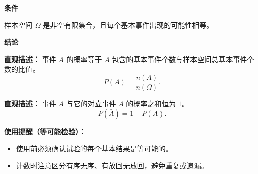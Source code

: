 \begin{statementbox}
	\textbf{\textcolor{CStatement}{条件}}
	\begin{description}[style=nextline, leftmargin=2.8em, labelsep=0.5em, itemsep=0.35em]
		\item[\textbf{\textcolor{CStatement}{条件1（有限等可能）：}}]
			样本空间 $\Omega$ 是非空有限集合，且每个基本事件出现的可能性相等。
	\end{description}
	\textbf{\textcolor{CStatement}{结论}}
	\begin{description}[style=nextline, leftmargin=2.8em, labelsep=0.5em, itemsep=0.45em]
		\item[\textbf{\textcolor{CStatement}{结论一（概率公式）：}}]
			\textbf{\textcolor{CStatement}{直观描述：}}
			事件 $A$ 的概率等于 $A$ 包含的基本事件个数与样本空间总基本事件个数的比值。
			\[
				P(A)=\frac{n(A)}{n(\Omega)}.
			\]
		\item[\textbf{\textcolor{CStatement}{推广结论（对立事件）：}}]
			\textbf{\textcolor{CStatement}{直观描述：}}
			事件 $A$ 与它的对立事件 $\bar{A}$ 的概率之和恒为 $1$。
			\[
				P(\bar{A})=1-P(A).
			\]
	\end{description}

	\medskip
	\textbf{\textcolor{CStatement}{使用提醒（等可能检验）：}}
	\begin{itemize}[leftmargin=*]
		\item 使用前必须确认试验的每个基本结果是等可能的。
		\item 计数时注意区分有序无序、有放回无放回，避免重复或遗漏。
	\end{itemize}

\end{statementbox}
